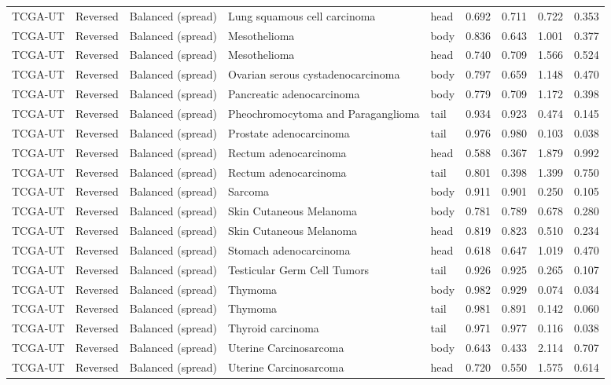 \begin{longtable}{lllllrrrr}
TCGA-UT & Reversed & Balanced (spread) & Lung squamous cell carcinoma & head & 0.692 & 0.711 & 0.722 & 0.353 \\
TCGA-UT & Reversed & Balanced (spread) & Mesothelioma & body & 0.836 & 0.643 & 1.001 & 0.377 \\
TCGA-UT & Reversed & Balanced (spread) & Mesothelioma & head & 0.740 & 0.709 & 1.566 & 0.524 \\
TCGA-UT & Reversed & Balanced (spread) & Ovarian serous cystadenocarcinoma & body & 0.797 & 0.659 & 1.148 & 0.470 \\
TCGA-UT & Reversed & Balanced (spread) & Pancreatic adenocarcinoma & body & 0.779 & 0.709 & 1.172 & 0.398 \\
TCGA-UT & Reversed & Balanced (spread) & Pheochromocytoma and Paraganglioma & tail & 0.934 & 0.923 & 0.474 & 0.145 \\
TCGA-UT & Reversed & Balanced (spread) & Prostate adenocarcinoma & tail & 0.976 & 0.980 & 0.103 & 0.038 \\
TCGA-UT & Reversed & Balanced (spread) & Rectum adenocarcinoma & head & 0.588 & 0.367 & 1.879 & 0.992 \\
TCGA-UT & Reversed & Balanced (spread) & Rectum adenocarcinoma & tail & 0.801 & 0.398 & 1.399 & 0.750 \\
TCGA-UT & Reversed & Balanced (spread) & Sarcoma & body & 0.911 & 0.901 & 0.250 & 0.105 \\
TCGA-UT & Reversed & Balanced (spread) & Skin Cutaneous Melanoma & body & 0.781 & 0.789 & 0.678 & 0.280 \\
TCGA-UT & Reversed & Balanced (spread) & Skin Cutaneous Melanoma & head & 0.819 & 0.823 & 0.510 & 0.234 \\
TCGA-UT & Reversed & Balanced (spread) & Stomach adenocarcinoma & head & 0.618 & 0.647 & 1.019 & 0.470 \\
TCGA-UT & Reversed & Balanced (spread) & Testicular Germ Cell Tumors & tail & 0.926 & 0.925 & 0.265 & 0.107 \\
TCGA-UT & Reversed & Balanced (spread) & Thymoma & body & 0.982 & 0.929 & 0.074 & 0.034 \\
TCGA-UT & Reversed & Balanced (spread) & Thymoma & tail & 0.981 & 0.891 & 0.142 & 0.060 \\
TCGA-UT & Reversed & Balanced (spread) & Thyroid carcinoma & tail & 0.971 & 0.977 & 0.116 & 0.038 \\
TCGA-UT & Reversed & Balanced (spread) & Uterine Carcinosarcoma & body & 0.643 & 0.433 & 2.114 & 0.707 \\
TCGA-UT & Reversed & Balanced (spread) & Uterine Carcinosarcoma & head & 0.720 & 0.550 & 1.575 & 0.614 \\

\end{longtable}
